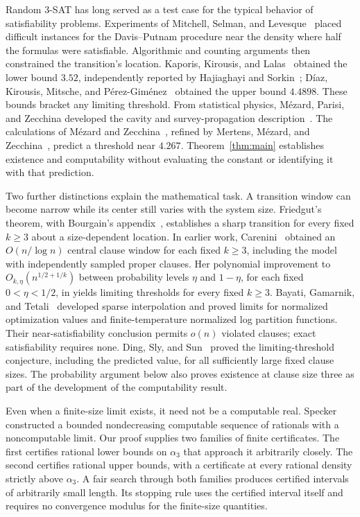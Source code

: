 Random 3-SAT has long served as a test case for the typical behavior of
satisfiability problems. Experiments of Mitchell, Selman, and
Levesque~\cite{MSL1992} placed difficult instances for the Davis--Putnam
procedure near the density where half the formulas were satisfiable.
Algorithmic and counting arguments then constrained the transition's
location. Kaporis, Kirousis, and Lalas~\cite{KaporisKirousisLalas2006}
obtained the lower bound $3.52$, independently reported by Hajiaghayi
and Sorkin~\cite{HajiaghayiSorkin2003}; D\'iaz, Kirousis, Mitsche, and
P\'erez-Gim\'enez~\cite{DiazKirousisMitschePerezGimenez2009} obtained the
upper bound $4.4898$. These bounds bracket any limiting threshold.
From statistical physics, M\'ezard, Parisi, and Zecchina developed the
cavity and survey-propagation description~\cite{MPZ2002}. The
calculations of M\'ezard and Zecchina~\cite{MZ2002}, refined by Mertens,
M\'ezard, and Zecchina~\cite{MMZ2006}, predict a threshold near $4.267$.
Theorem~\ref{thm:main}
establishes existence and computability without evaluating the constant
or identifying it with that prediction.

Two further distinctions explain the mathematical task. A transition
window can become narrow while its center still varies with the system
size. Friedgut's theorem, with Bourgain's appendix~\cite{Friedgut1999},
establishes a sharp transition for every fixed $k\ge3$ about a
size-dependent location. In earlier work,
Carenini~\cite[Corollaries~7.10--7.11]{Carenini} obtained an
$O(n/\log n)$ central clause window for each fixed $k\ge3$, including
the model with independently sampled proper clauses. Her polynomial
improvement to $O_{k,\eta}(n^{1/2+1/k})$ between probability levels
$\eta$ and $1-\eta$, for each fixed $0<\eta<1/2$, in
\cite[Theorem~1.1]{Carenini2026Polynomial} yields limiting thresholds
for every fixed $k\ge3$.
Bayati, Gamarnik, and Tetali~\cite{BGT2013} developed sparse
interpolation and proved limits for normalized optimization values and
finite-temperature normalized log partition functions. Their near-satisfiability
conclusion permits $o(n)$ violated clauses; exact satisfiability requires
none. Ding, Sly, and Sun~\cite{DSS2022} proved the
limiting-threshold conjecture, including the predicted value, for all
sufficiently large fixed clause sizes. The probability argument below
also proves existence at clause size three as part of the development
of the computability result.

Even when a finite-size limit exists, it need not be a computable real.
Specker~\cite[Satz~IV]{Specker1949} constructed a bounded nondecreasing
computable sequence of rationals with a noncomputable limit. Our proof
supplies two families of finite certificates. The first certifies
rational lower bounds on $\alpha_3$ that approach it arbitrarily closely.
The second certifies rational upper bounds, with a certificate at every
rational density strictly above $\alpha_3$. A fair search through both
families produces certified intervals of arbitrarily small length. Its
stopping rule uses the certified interval itself and requires no
convergence modulus for the finite-size quantities.
